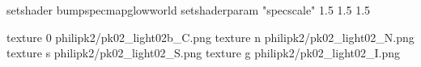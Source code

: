 setshader bumpspecmapglowworld
setshaderparam "specscale" 1.5 1.5 1.5


texture 0 philipk2/pk02_light02b_C.png
texture n philipk2/pk02_light02_N.png
texture s philipk2/pk02_light02_S.png
texture g philipk2/pk02_light02_I.png

